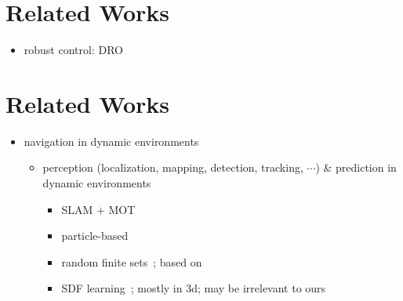 \documentclass[lettersize,journal]{IEEEtran}
\begin{document}
\section{Related Works}
\begin{itemize}
    \item robust control: DRO~\cite{long2026sensor}
\end{itemize}


\section{Related Works}
\begin{itemize}
    \item navigation in dynamic environments
    \begin{itemize}
        \item perception (localization, mapping, detection, tracking, $\cdots$) \& prediction in dynamic environments
        \begin{itemize}
            \item SLAM $+$ MOT~\cite{wang2007simultaneous,coue2006bayesian}

            \item particle-based~\cite{danescu2011modeling,tanzmeister2014grid}
            
            \item random finite sets~\cite{nuss2018random,chen2023continuous}; based on~\cite{mahler2007statistical}

            \item SDF learning~\cite{park2019deepsdf,ortiz2022isdf}; mostly in 3d; may be irrelevant to ours
        \end{itemize}
    \end{itemize}

    
\end{itemize}
\end{document}
